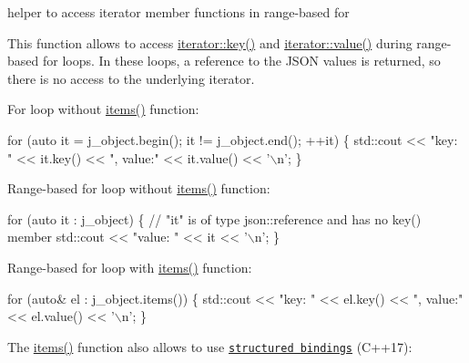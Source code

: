 helper to access iterator member functions in range-\/based for 

This function allows to access \mbox{\hyperlink{classnlohmann_1_1detail_1_1iter__impl_a15dfb2744fed2ef40c12a9e9a20d6dbc}{iterator\+::key()}} and \mbox{\hyperlink{classnlohmann_1_1detail_1_1iter__impl_ab447c50354c6611fa2ae0100ac17845c}{iterator\+::value()}} during range-\/based for loops. In these loops, a reference to the J\+S\+ON values is returned, so there is no access to the underlying iterator.

For loop without {\ttfamily \mbox{\hyperlink{classnlohmann_1_1basic__json_afe3e137ace692efa08590d8df40f58dd}{items()}}} function\+:


\begin{DoxyCode}
\textcolor{keywordflow}{for} (\textcolor{keyword}{auto} it = j\_object.begin(); it != j\_object.end(); ++it)
\{
    std::cout << \textcolor{stringliteral}{"key: "} << it.key() << \textcolor{stringliteral}{", value:"} << it.value() << \textcolor{charliteral}{'\(\backslash\)n'};
\}
\end{DoxyCode}


Range-\/based for loop without {\ttfamily \mbox{\hyperlink{classnlohmann_1_1basic__json_afe3e137ace692efa08590d8df40f58dd}{items()}}} function\+:


\begin{DoxyCode}
\textcolor{keywordflow}{for} (\textcolor{keyword}{auto} it : j\_object)
\{
    \textcolor{comment}{// "it" is of type json::reference and has no key() member}
    std::cout << \textcolor{stringliteral}{"value: "} << it << \textcolor{charliteral}{'\(\backslash\)n'};
\}
\end{DoxyCode}


Range-\/based for loop with {\ttfamily \mbox{\hyperlink{classnlohmann_1_1basic__json_afe3e137ace692efa08590d8df40f58dd}{items()}}} function\+:


\begin{DoxyCode}
\textcolor{keywordflow}{for} (\textcolor{keyword}{auto}& el : j\_object.items())
\{
    std::cout << \textcolor{stringliteral}{"key: "} << el.key() << \textcolor{stringliteral}{", value:"} << el.value() << \textcolor{charliteral}{'\(\backslash\)n'};
\}
\end{DoxyCode}


The {\ttfamily \mbox{\hyperlink{classnlohmann_1_1basic__json_afe3e137ace692efa08590d8df40f58dd}{items()}}} function also allows to use \href{https://en.cppreference.com/w/cpp/language/structured_binding}{\tt structured bindings} (C++17)\+:


